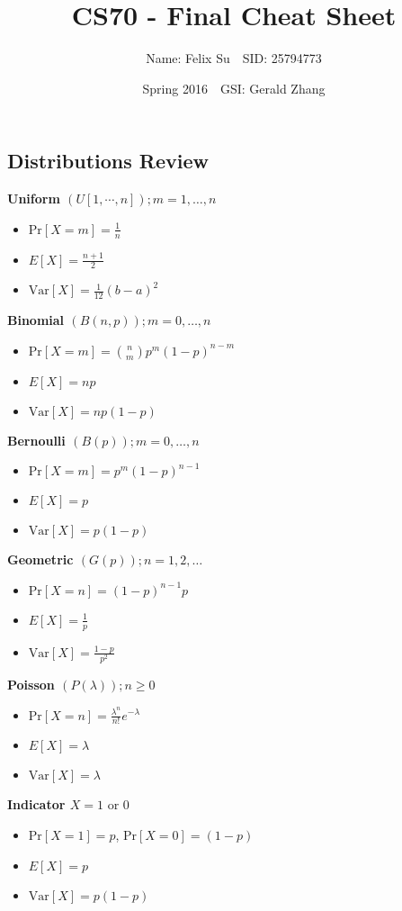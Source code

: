 \documentclass{article}
\title{CS70 - Final Cheat Sheet}
\author{Name: Felix Su$\quad$SID: 25794773}
\date{Spring 2016$\quad$GSI: Gerald Zhang}
\newcommand{\x}[1]{\textrm{#1}}
\newcommand{\pr}[1]{\textrm{Pr}[#1]}
\newcommand{\xs}[1]{\textrm{ #1 }}
\newcommand{\eqs}[1]{\begin{mdframed}#1\end{mdframed}}
\newcommand{\items}[1]{\begin{itemize}#1\end{itemize}}
\newcommand{\rng}[2]{#1,\ldots,#2}
\newcommand{\E}[1]{E[#1]}
\newcommand{\var}[1]{\x{Var}[#1]}
\begin{document}
\maketitle

\subsection*{Distributions Review}
\eqs{
\begin{minipage}{.5\linewidth}
\textbf{Uniform $(U[1,\cdots,n]); m=\rng{1}{n}$}
    \items{
        \item $\pr{X=m}=\frac 1n$
        \item $\E{X}=\frac{n+1}{2}$
        \item $\var{X}=\frac{1}{12}(b-a)^2$
    }
    \item \textbf{Binomial $(B(n,p)); m=\rng{0}{n}$}
    \items{
        \item $\pr{X=m}=\binom{n}{m}p^m(1-p)^{n-m}$
        \item $\E{X}=np$
        \item $\var{X}=np(1-p)$
    }
    \item \textbf{Bernoulli $(B(p)); m=\rng{0}{n}$}
    \items{
        \item $\pr{X=m}=p^m(1-p)^{n-1}$
        \item $\E{X}=p$
        \item $\var{X}=p(1-p)$
    }
\end{minipage}
\begin{minipage}{.5\linewidth}
    \item \textbf{Geometric $(G(p)); n=1,2,\ldots$}
    \items{
        \item $\pr{X=n}=(1-p)^{n-1}p$
        \item $\E{X}=\frac 1p$
        \item $\var{X}=\frac{1-p}{p^2}$
    }
    \item \textbf{Poisson $(P(\lambda)); n\ge 0$}
    \items{
        \item $\pr{X=n}=\frac{\lambda^n}{n!}e^{-\lambda}$
        \item $\E{X}=\lambda$
        \item $\var{X}=\lambda$
    }
    \item \textbf{Indicator $X=1\xs{or}0$}
    \items{
        \item $\pr{X=1}=p$, $\pr{X=0}=(1-p)$
        \item $\E{X}=p$
        \item $\var{X}=p(1-p)$
    }
\end{minipage}
}
\end{document}
